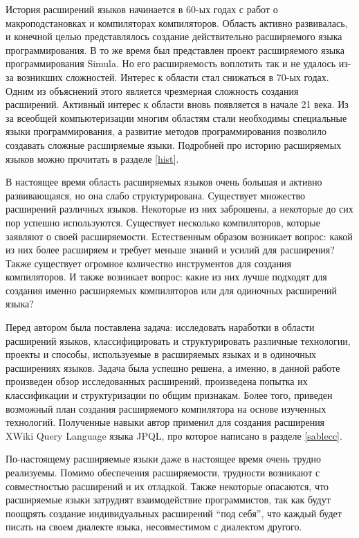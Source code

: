 \documentclass[a4paper,12pt,titlepage]{extarticle}
\begin{document}
История расширений языков начинается в 60-ых
годах с работ о макроподстановках и компиляторах компиляторов. Область активно развивалась, и
конечной целью представлялось создание действительно расширяемого языка
программирования. В то же время был представлен проект расширяемого языка программирования Simula.
Но его расширяемость воплотить так и не удалось из-за возникших сложностей.
Интерес к области стал снижаться в 70-ых годах. Одним из объяснений
этого является чрезмерная сложность создания расширений. Активный интерес к
области вновь появляется в начале 21 века. Из за всеобщей компьютеризации
многим областям стали необходимы специальные языки программирования, а развитие
методов программирования позволило создавать сложные расширяемые языки.
Подробней про историю расширяемых языков можно прочитать в разделе \ref{hist}.

В настоящее время область расширяемых языков очень большая и активно
развивающаяся, но она слабо структурирована. Существует множество расширений
различных языков. Некоторые из них заброшены, а некоторые до сих пор успешно
используются. Существует несколько компиляторов, которые заявляют о своей
расширяемости. Естественным образом возникает вопрос: какой из них более
расширяем и требует меньше знаний и усилий для расширения? Также существует
огромное количество инструментов для создания компиляторов. И также возникает
вопрос: какие из них лучше подходят для создания именно расширяемых
компиляторов или для одиночных расширений языка? 

Перед автором была поставлена задача: исследовать наработки в области
расширений языков, классифицировать и структурировать различные технологии,
проекты и способы, используемые в расширяемых языках и в одиночных расширениях
языков. Задача была успешно решена, а именно, в данной работе произведен обзор
исследованных расширений, произведена попытка их классификации и структуризации
по общим признакам. Более того, приведен возможный план создания расширяемого
компилятора на основе изученных технологий. Полученные навыки автор применил
для создания расширения XWiki Query Language языка JPQL, про которое написано в
разделе \ref{sablecc}.

По-настоящему расширяемые языки даже в настоящее время очень трудно
реализуемы. Помимо обеспечения расширяемости, трудности возникают с
совместностью расширений и их отладкой. Также некоторые опасаются, что
расширяемые языки затруднят взаимодействие программистов, так как будут
поощрять создание индивидуальных расширений ``под себя'', что каждый будет
писать на своем диалекте языка, несовместимом с диалектом другого.
\end{document}
